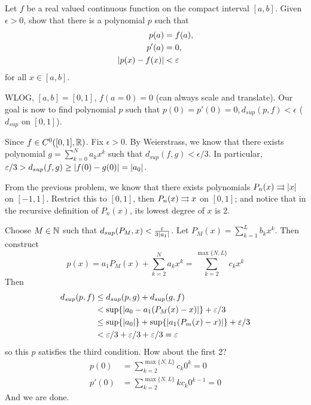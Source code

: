 \documentclass[a4paper, 12pt]{article}
\begin{document}
\begin{problem} 
    Let $f$ be a real valued continuous function on the compact interval $[a, b]$. Given $\epsilon > 0$, show that there is a polynomial $p$ such that
    \begin{align*}
        p(a) &= f(a), \\
        p'(a) &= 0,\\
        \abs{p(x) - f(x)} &< \epsilon
    \end{align*}
    for all $x \in [a, b]$.
\end{problem}
\begin{solution}
    WLOG, $[a, b] = [0, 1]$, $f(a = 0) = 0$ (can always scale and translate). Our goal is now to find polynomial $p$ such that $p(0) = p'(0) = 0, d_{sup}(p, f) < \epsilon$ ($d_{sup}$ on $[0, 1]$).

    
    Since $f \in C^0([0, 1], \bbr)$. Fix $\epsilon > 0$. By Weierstrass, we know that there exists polynomial $g = \sum_{k=0}^{N} a_k x^k$ such that $d_{sup}(f, g) < \epsilon/3$. In particular, $\epsilon / 3 > d_{sup}(f, g) \geq \abs{f(0) - g(0)} = \abs{a_0}$.
    
    From the previous problem, we know that there exists polynomials $P_n(x) \unicvg \abs{x}$ on $[-1, 1]$. Restrict this to $[0, 1]$, then $P_n(x) \unicvg x$ on $[0, 1]$; and notice that in the recursive definition of $P_n(x)$, its lowest degree of $x$ is 2.

    Choose $M \in \bbn$ such that $d_{sup}(P_M, x) < \frac{\epsilon}{3\abs{a_1}}$. Let $P_M(x) = \sum_{k=1}^{L} b_k x^{k}$.
     Then construct \begin{equation*}
    p(x) = a_1P_M(x) + \sum_{k=2}^{N} a_k x^k = \sum_{k=2}^{\max\{N, L\}} c_k x^k
    \end{equation*}
    Then \begin{align*}
        d_{sup}(p, f) &\leq d_{sup}(p, g) + d_{sup}(g, f) \\
        & < \sup\{\abs*{a_0 - a_1 (P_M(x) - x)}\} + \epsilon/3 \\
        & \leq \sup\{\abs{a_0}\} + \sup\{\abs{a_1 (P_m(x) - x)}\} + \epsilon / 3 \\
        & < \epsilon/3 + \epsilon/3 + \epsilon/3 = \epsilon
    \end{align*}
    so this $p$ satisfies the third condition. How about the first 2?
    \begin{align*}
        p(0) &= \sum_{k=2}^{\max\{N, L\}} c_k 0^k = 0 \\
        p'(0) &= \sum_{k=2}^{\max\{N, L\}} kc_k0^{k-1} = 0
    \end{align*}
    And we are done.
\end{solution}
\end{document}
